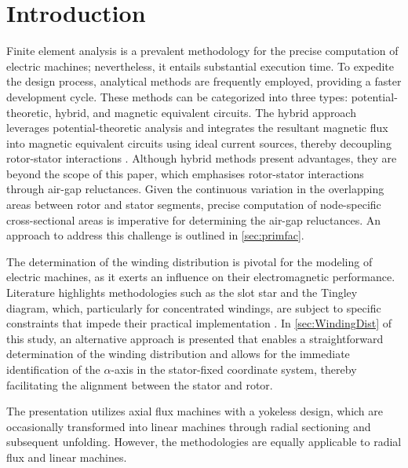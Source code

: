 \section{Introduction}\label{sec:Intro}
Finite element analysis is a prevalent methodology for the precise computation of electric machines; nevertheless, it entails substantial execution time. To expedite the design process, analytical methods are frequently employed, providing a faster development cycle. These methods can be categorized into three types: potential-theoretic, hybrid, and magnetic equivalent circuits. The hybrid approach leverages potential-theoretic analysis and integrates the resultant magnetic flux into magnetic equivalent circuits using ideal current sources, thereby decoupling rotor-stator interactions \cite{Huang2014, Kano2010}. Although hybrid methods present advantages, they are beyond the scope of this paper, which emphasises rotor-stator interactions through air-gap reluctances. Given the continuous variation in the overlapping areas between rotor and stator segments, precise computation of node-specific cross-sectional areas is imperative for determining the air-gap reluctances. An approach to address this challenge is outlined in \cref{sec:primfac}.

The determination of the winding distribution is pivotal for the modeling of electric machines, as it exerts an influence on their electromagnetic performance. Literature highlights methodologies such as the slot star and the Tingley diagram, which, particularly for concentrated windings, are subject to specific constraints that impede their practical implementation \cite{MüllerBerechnung, Binder2018, Rocha20}. In \cref{sec:WindingDist} of this study, an alternative approach is presented that enables a straightforward determination of the winding distribution and allows for the immediate identification of the $\alpha$-axis in the stator-fixed coordinate system, thereby facilitating the alignment between the stator and rotor.

The presentation utilizes axial flux machines with a yokeless design, which are occasionally transformed into linear machines through radial sectioning and subsequent unfolding. However, the methodologies are equally applicable to radial flux and linear machines.